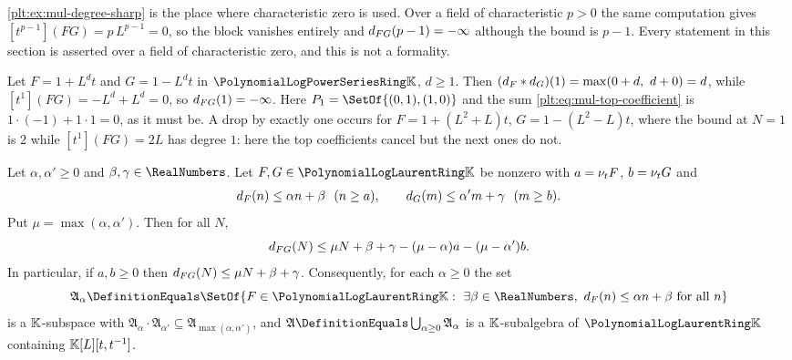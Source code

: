 \begin{warningbox}
\cref{plt:ex:mul-degree-sharp} is the place where characteristic zero is
used.  Over a field of characteristic $p>0$ the same computation gives
$[t^{p-1}](FG)=p\,L^{p-1}=0$, so the block vanishes entirely and
$d_{FG}(p-1)=-\infty$ although the bound is $p-1$.  Every statement in
this section is asserted over a field of characteristic zero, and this is not
a formality.
\end{warningbox}

\begin{example}
\label{plt:ex:mul-degree-drop}
Let $F=1+L^{d}t$ and $G=1-L^{d}t$ in $\PLpow$, $d\ge1$.  Then
$(\dprofile{F}\ast\dprofile{G})(1)=\max(0+d,\ d+0)=d$, while
$[t^1](FG)=-L^{d}+L^{d}=0$, so $d_{FG}(1)=-\infty$.  Here
$P_1=\SetOf{(0,1),(1,0)}$ and the sum
\eqref{plt:eq:mul-top-coefficient} is $1\cdot(-1)+1\cdot1=0$, as it must be.
A drop by exactly one occurs for $F=1+(L^2+L)t$, $G=1-(L^2-L)t$, where the
bound at $N=1$ is $2$ while $[t^1](FG)=2L$ has degree $1$: here the top
coefficients cancel but the next ones do not.
\end{example}

\begin{proposition}
\label{plt:prop:mul-affine-profile}
Let $\alpha,\alpha'\ge0$ and $\beta,\gamma\in\RealNumbers$.  Let
$F,G\in\PLlau$ be nonzero with $a=\nu_{t} F$, $b=\nu_{t} G$ and
\[
 d_{F}(n)\le\alpha n+\beta\ \ (n\ge a),
 \qquad
 d_{G}(m)\le\alpha'm+\gamma\ \ (m\ge b).
\]
Put $\mu=\max(\alpha,\alpha')$.  Then for all $N$,
\begin{equation}\label{plt:eq:mul-affine-bound}
 d_{FG}(N)\le\mu N+\beta+\gamma-(\mu-\alpha)a-(\mu-\alpha')b .
\end{equation}
In particular, if $a,b\ge0$ then $d_{FG}(N)\le\mu N+\beta+\gamma$.
Consequently, for each $\alpha\ge0$ the set
\[
 \mathfrak A_\alpha
 \DefinitionEquals
 \SetOf{F\in\PLlau:\ \exists\beta\in\RealNumbers,\
        \dprofile{F}(n)\le\alpha n+\beta\ \text{for all }n}
\]
is a $\mathbb{K}$-subspace with
$\mathfrak A_\alpha\cdot\mathfrak A_{\alpha'}\subseteq
\mathfrak A_{\max(\alpha,\alpha')}$, and
$\mathfrak A\DefinitionEquals\bigcup_{\alpha\ge0}\mathfrak A_\alpha$ is a
$\mathbb{K}$-subalgebra of $\PLlau$ containing $\mathbb{K}[L][t,t^{-1}]$.
\end{proposition}

